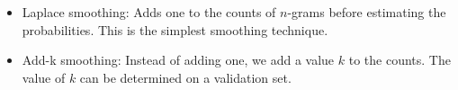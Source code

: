 \begin{itemize}
    \item Laplace smoothing: Adds one to the counts of $n$-grams before estimating the probabilities. This is the simplest smoothing technique.
    \item Add-k smoothing: Instead of adding one, we add a value $k$ to the counts. The value of $k$ can be determined on a validation set. 
\end{itemize}











